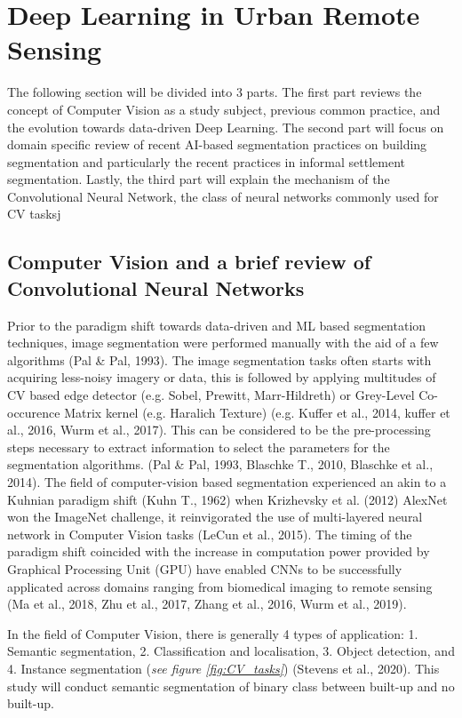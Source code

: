 \documentclass[11pt, a4paper, twoside]{report}
\begin{document}
\section{Deep Learning in Urban Remote Sensing}\label{DLinRS}

The following section will be divided into 3 parts. The first part reviews the concept of Computer Vision as a study subject, previous common practice, and the evolution towards data-driven Deep Learning. The second part will focus on domain specific review of recent AI-based segmentation practices on building segmentation and particularly the recent practices in informal settlement segmentation. Lastly, the third part will explain the mechanism of the Convolutional Neural Network, the class of neural networks commonly used for CV tasksj

\subsection{Computer Vision and a brief review of Convolutional Neural Networks}\label{CVinBS}

Prior to the paradigm shift towards data-driven and ML based segmentation techniques, image segmentation were performed manually with the aid of a few algorithms (Pal \& Pal, 1993). The image segmentation tasks often starts with acquiring less-noisy imagery or data, this is followed by applying multitudes of CV based edge detector (e.g. Sobel, Prewitt, Marr-Hildreth) or Grey-Level Co-occurence Matrix kernel (e.g. Haralich Texture) (e.g. Kuffer et al., 2014, kuffer et al., 2016, Wurm et al., 2017). This can be considered to be the pre-processing steps necessary to extract information to select the parameters for the segmentation algorithms. (Pal \& Pal, 1993, Blaschke T., 2010, Blaschke et al., 2014). The field of computer-vision based segmentation experienced an akin to a Kuhnian paradigm shift (Kuhn T., 1962) when Krizhevsky et al. (2012) AlexNet won the ImageNet challenge, it reinvigorated the use of multi-layered neural network in Computer Vision tasks (LeCun et al., 2015). The timing of the paradigm shift coincided with the increase in computation power provided by Graphical Processing Unit (GPU) have enabled CNNs to be successfully applicated across domains ranging from biomedical imaging to remote sensing (Ma et al., 2018, Zhu et al., 2017, Zhang et al., 2016, Wurm et al., 2019).\\\par

In the field of Computer Vision, there is generally 4 types of application: 1. Semantic segmentation, 2. Classification and localisation, 3. Object detection, and 4. Instance segmentation (\textit{see figure {\ref{fig:CV_tasks}}}) (Stevens et al., 2020). This study will conduct semantic segmentation of binary class between built-up and no built-up.\\\par
\end{document}

